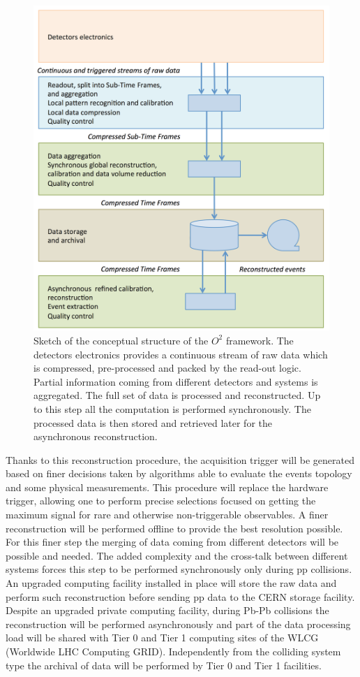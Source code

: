 \begin{figure}[]
\begin{center}
\includegraphics[width=0.95\linewidth]{Chapters/O2/Figs/O2.png}
\caption{Sketch of the conceptual structure of the $O^2$ framework. The detectors electronics provides a continuous stream of raw data which is compressed, pre-processed and packed by the read-out logic. Partial information coming from different detectors and systems is aggregated. The full set of data is processed and reconstructed. Up to this step all the computation is performed synchronously. The processed data is then stored and retrieved later for the asynchronous reconstruction.}
\label{fig:O2_sketch}
\end{center}
\end{figure}

Thanks to this reconstruction procedure, the acquisition trigger will be generated based on finer decisions taken by algorithms able to evaluate the events topology and some physical measurements.
This procedure will replace the hardware trigger, allowing one to perform precise selections focused on getting the maximum signal for rare and otherwise non-triggerable observables.
A finer reconstruction will be performed offline to provide the best resolution possible.
For this finer step the merging of data coming from different detectors will be possible and needed.
The added complexity and the cross-talk between different systems forces this step to be performed synchronously only during pp collisions.
An upgraded computing facility installed in place will store the raw data and perform such reconstruction before sending pp data to the CERN storage facility.
Despite an upgraded private computing facility, during Pb-Pb collisions the reconstruction will be performed asynchronously and part of the data processing load will be shared with Tier 0 and Tier 1 computing sites of the WLCG (Worldwide LHC Computing GRID).
Independently from the colliding system type the archival of data will be performed by Tier 0 and Tier 1 facilities.


